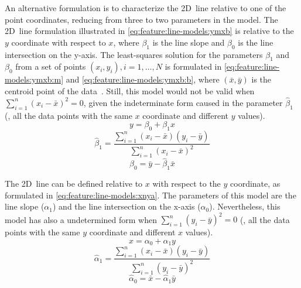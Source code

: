 An alternative formulation is to characterize the 2D~line relative to one
of the point coordinates, reducing from three to two parameters in the model.
The 2D~line formulation illustrated in \eqref{eq:feature:line-models:ymxb}
is relative to the $y$ coordinate with respect to $x$, where $\beta_1$ is
the line slope and $\beta_0$ is the line intersection on the y-axis.
The least-squares solution for the parameters $\beta_1$ and $\beta_0$
from a set of points $\left(x_i,y_i\right),i=1,\dots,N$ is formulated
in \eqref{eq:feature:line-models:ymxb:m} and
\eqref{eq:feature:line-models:ymxb:b}, where $\left(\bar{x},\bar{y}\right)$ is
the centroid point of the data~\cite{kenney-keeping:book:1962}.
Still, this model would not be valid when
$\sum_{i=1}^{n} \left(x_i - \bar{x}\right)^2=0$,
given the indeterminate form caused in the parameter $\hat{\beta}_1$ (\eg,
all the data points with the same $x$ coordinate and different $y$ values).
\begin{equation}\label{eq:feature:line-models:ymxb}
y = \beta_0 + \beta_1 x
\end{equation}
\begin{equation}\label{eq:feature:line-models:ymxb:m}
\hat{\beta}_1 = \frac{\sum_{i=1}^{n} \left(x_i - \bar{x}\right)\left(y_i - \bar{y}\right)}{\sum_{i=1}^{n} \left(x_i - \bar{x}\right)^2}
\end{equation}
\begin{equation}\label{eq:feature:line-models:ymxb:b}
\hat{\beta}_0 = \bar{y} - \hat{\beta}_1 \bar{x}
\end{equation}

The 2D~line can be defined relative to $x$ with respect to the $y$ coordinate,
as formulated in \eqref{eq:feature:line-models:xnya}.
The parameters of this model are the line slope
($\alpha_1$) and the line intersection on the x-axis ($\alpha_0$).
Nevertheless, this model has also a undetermined form
when $\sum_{i=1}^{n} \left(y_i - \bar{y}\right)^2=0$
(\eg, all the data points with the same $y$ coordinate and different $x$ values).
\begin{equation}\label{eq:feature:line-models:xnya}
x = \alpha_0 + \alpha_1 y
\end{equation}
\begin{equation}\label{eq:feature:line-models:xnya:n}
\hat{\alpha}_1 = \frac{\sum_{i=1}^{n} \left(x_i - \bar{x}\right)\left(y_i - \bar{y}\right)}{\sum_{i=1}^{n} \left(y_i - \bar{y}\right)^2}
\end{equation}
\begin{equation}\label{eq:feature:line-models:xnya:a}
\hat{\alpha}_0 = \bar{x} - \hat{\alpha}_1 \bar{y}
\end{equation}

